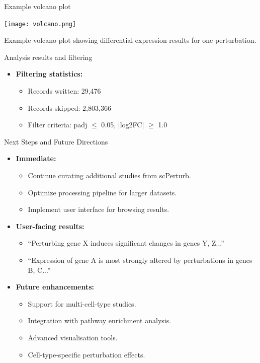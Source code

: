 \documentclass[handout]{beamer}
\begin{document}
\begin{frame}{Example volcano plot}
    \begin{center}
        \texttt{[image: volcano.png]}
        
        \vspace{1em}
        Example volcano plot showing differential expression results for one perturbation.
    \end{center}
\end{frame}

\begin{frame}{Analysis results and filtering}
    \begin{itemize}
        \item \textbf{Filtering statistics:}
        \begin{itemize}
            \item Records written: 29,476
            \item Records skipped: 2,803,366
            \item Filter criteria: padj $\leq$ 0.05, |log2FC| $\geq$ 1.0
        \end{itemize}
    \end{itemize}
\end{frame}

\begin{frame}{Next Steps and Future Directions}
    \begin{itemize}
        \item \textbf{Immediate:}
        \begin{itemize}
            \item Continue curating additional studies from scPerturb.
            \item Optimize processing pipeline for larger datasets.
            \item Implement user interface for browsing results.
        \end{itemize}
        \item \textbf{User-facing results:}
        \begin{itemize}
            \item ``Perturbing gene X induces significant changes in genes Y, Z...''
            \item ``Expression of gene A is most strongly altered by perturbations in genes B, C...''
        \end{itemize}
        \item \textbf{Future enhancements:}
        \begin{itemize}
            \item Support for multi-cell-type studies.
            \item Integration with pathway enrichment analysis.
            \item Advanced visualisation tools.
            \item Cell-type-specific perturbation effects.
        \end{itemize}
    \end{itemize}
\end{frame}
\end{document}
